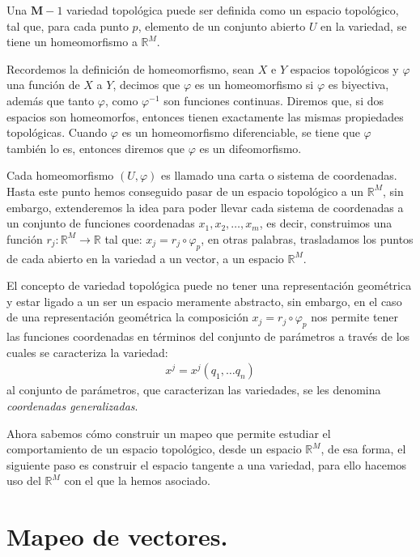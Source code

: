 Una $\mathbf{M}-1$ variedad topológica puede ser definida como un espacio topológico, tal que, para cada punto $p$, elemento de un conjunto abierto $U$ en la variedad, se tiene un homeomorfismo a $\mathbb{R}^{M}$.
\par
Recordemos la definición de homeomorfismo, sean $X$ e $Y$ espacios topológicos y $\varphi$ una función de $X$ a $Y$, decimos que $\varphi$ es un homeomorfismo si $\varphi$ es biyectiva, además que tanto $\varphi$, como $\varphi^{-1}$ son funciones continuas. Diremos que, si dos espacios son homeomorfos, entonces tienen exactamente las mismas propiedades topológicas. Cuando $\varphi$ es un homeomorfismo diferenciable, se tiene que $\varphi$ también lo es, entonces diremos que $\varphi$ es un difeomorfismo.
\par
Cada homeomorfismo $(U, \varphi)$ es llamado una carta o sistema de coordenadas. Hasta este punto hemos conseguido pasar de un espacio topológico a un $\mathbb{R}^{M}$, sin embargo, extenderemos la idea para poder llevar cada sistema de coordenadas a un conjunto de funciones coordenadas $x_{1}, x_{2}, \ldots, x_{m}$, es decir, construimos una función $r_{j} : \mathbb{R}^{M} \rightarrow \mathbb{R}$ tal que: $x_{j} = r_{j} \circ \varphi_{p}$, en otras palabras, trasladamos los puntos de cada abierto en la variedad a un vector, a un espacio $\mathbb{R}^{M}$.
\par
El concepto de variedad topológica puede no tener una representación geométrica y estar ligado a un ser un espacio meramente abstracto, sin embargo, en el caso de una representación geométrica la composición $x_{j} = r_{j} \circ \varphi_{p}$ nos permite tener las funciones coordenadas en términos del conjunto de parámetros a través de los cuales se caracteriza la variedad:
\begin{align}
x^{j} = x^{j} (q_{1}, \ldots q_{n})
\label{eq:ecuacion_01_01}
\end{align}
al conjunto de parámetros, que caracterizan las variedades, se les denomina \emph{coordenadas generalizadas}.
\par
Ahora sabemos cómo construir un mapeo que permite estudiar el comportamiento de un espacio topológico, desde un espacio $\mathbb{R}^{M}$, de esa forma, el siguiente paso es construir el espacio tangente a una variedad, para ello hacemos uso del $\mathbb{R}^{M}$ con el que la hemos asociado.
\section{Mapeo de vectores.}

